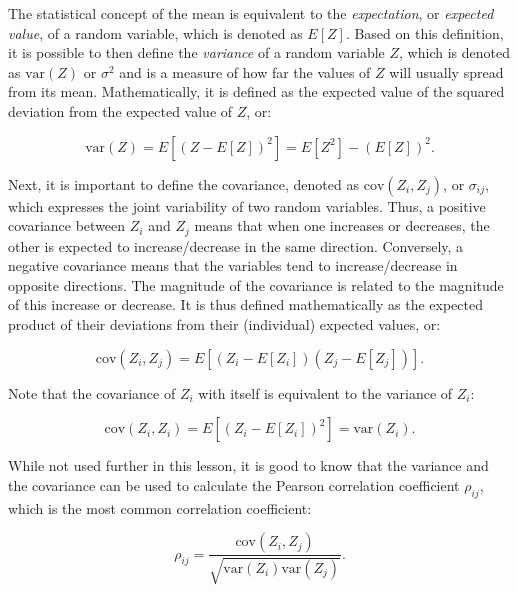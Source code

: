 The statistical concept of the mean is equivalent to the \emph{expectation}, or \emph{expected value}, of a random variable, which is denoted as \(E[Z]\).
Based on this definition, it is possible to then define the \emph{variance} of a random variable \(Z\), which is denoted as \(\mathrm{var}(Z)\) or \(\sigma^2\) and is a measure of how far the values of \(Z\) will usually spread from its mean.
Mathematically, it is defined as the expected value of the squared deviation from the expected value of \(Z\), or:

\begin{equation}
\mathrm{var}(Z) = E\left[{\left(Z-E\left[Z\right]\right)}^2\right] = E[Z^2]-{(E[Z])}^2.
\end{equation}

Next, it is important to define the covariance, denoted as \(\mathrm{cov}(Z_i,Z_j)\), or \(\sigma_{ij}\), which expresses the joint variability of two random variables.
Thus, a positive covariance between \(Z_i\) and \(Z_j\) means that when one increases or decreases, the other is expected to increase/decrease in the same direction.
Conversely, a negative covariance means that the variables tend to increase/decrease in opposite directions.
The magnitude of the covariance is related to the magnitude of this increase or decrease.
It is thus defined mathematically as the expected product of their deviations from their (individual) expected values, or:

\begin{equation}
\mathrm{cov}(Z_i,Z_j) = E\left[\left(Z_i-E[Z_i]\right)\left(Z_j-E[Z_j]\right)\right].
\end{equation}

Note that the covariance of \(Z_i\) with itself is equivalent to the variance of \(Z_i\):

\begin{equation}
\mathrm{cov}(Z_i,Z_i) = E\left[\left(Z_i-E[Z_i]\right)^2\right] = \mathrm{var}(Z_i).
\end{equation}

While not used further in this lesson, it is good to know that the variance and the covariance can be used to calculate the Pearson correlation coefficient \(\rho_{ij}\), which is the most common correlation coefficient:

\begin{equation}
\rho_{ij}=\frac{\mathrm{cov}(Z_i, Z_j)}{\sqrt{\mathrm{var}(Z_i) \mathrm{var}(Z_j)}}.
\end{equation}

